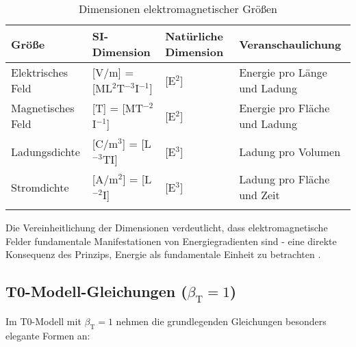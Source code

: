 \documentclass[12pt,a4paper]{article}
\newcommand{\betaT}{\beta_{\text{T}}}
\begin{document}
	\begin{table}[ht]
		\centering
		\begin{adjustbox}{scale=0.85}
			\begin{tabular}{llll}
				\hline
				\textbf{Größe} & \textbf{SI-Dimension} & \textbf{Natürliche Dimension} & \textbf{Veranschaulichung} \\
				\hline
				Elektrisches Feld & [V/m] = [ML$^2$T$^{-3}$I$^{-1}$] & [E$^2$] & Energie pro Länge und Ladung \\
				Magnetisches Feld & [T] = [MT$^{-2}$I$^{-1}$] & [E$^2$] & Energie pro Fläche und Ladung \\
				Ladungsdichte & [C/m$^3$] = [L$^{-3}$TI] & [E$^3$] & Ladung pro Volumen \\
				Stromdichte & [A/m$^2$] = [L$^{-2}$I] & [E$^3$] & Ladung pro Fläche und Zeit \\
				\hline
			 \multicolumn{3}{c}{} \\
				\hline
			\end{tabular}
		\end{adjustbox}
		\caption{Dimensionen elektromagnetischer Größen}
		\label{tab:em_dimensions}
	\end{table}
	
	Die Vereinheitlichung der Dimensionen verdeutlicht, dass elektromagnetische Felder fundamentale Manifestationen von Energiegradienten sind - eine direkte Konsequenz des Prinzips, Energie als fundamentale Einheit zu betrachten \cite{pascher_alpha_2025}.
	
	\subsection{T0-Modell-Gleichungen ($\betaT = 1$)}
	
	Im T0-Modell mit $\betaT = 1$ nehmen die grundlegenden Gleichungen besonders elegante Formen an:
	
\end{document}
